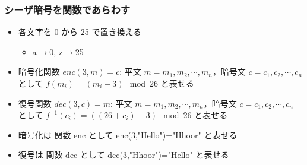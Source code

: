 \begin{frame}
\frametitle{シーザ暗号を関数であらわす}
  \begin{itemize}
\item 各文字を 0 から 25 で置き換える
    \begin{itemize}
\item a$\rightarrow$0, z$\rightarrow$25
    \end{itemize}
\item 暗号化関数 \(\mathit{enc}(3,m)=c\): 平文 \(m=m_1,m_2,\cdots,m_n\)，暗号文 \(c=c_1,c_2,\cdots,c_n\) として \(f(m_i)=(m_i+3)\mod 26\) と表せる
\item 復号関数 \(\mathit{dec}(3,c)=m\): 平文 \(m=m_1,m_2,\cdots,m_n\)，暗号文 \(c=c_1,c_2,\cdots,c_n\) として \(f^{-1}(c_i)=((26+c_i)-3)\mod 26\) と表せる
  \end{itemize}
  \begin{center}
    \begin{example}
      \begin{itemize}
\item 暗号化は 関数 enc として enc(3,"Hello")="Hhoor" と表せる
\item 復号は 関数 dec として dec(3,"Hhoor")="Hello" と表せる
      \end{itemize}
    \end{example}
  \end{center}
\end{frame}
%
%

